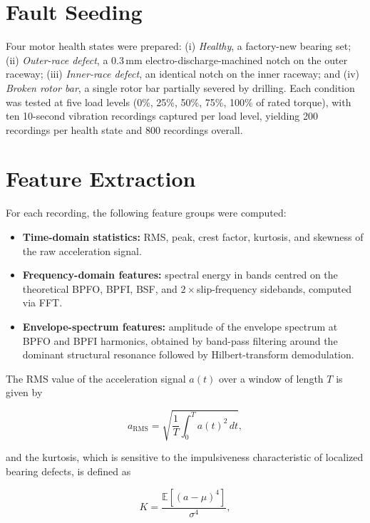 \documentclass[12pt,a4paper]{report}
\begin{document}
\section{Fault Seeding}
Four motor health states were prepared: (i) \emph{Healthy}, a factory-new bearing set; (ii)
\emph{Outer-race defect}, a 0.3\,mm electro-discharge-machined notch on the outer raceway; (iii)
\emph{Inner-race defect}, an identical notch on the inner raceway; and (iv) \emph{Broken rotor
bar}, a single rotor bar partially severed by drilling. Each condition was tested at five load
levels (0\%, 25\%, 50\%, 75\%, 100\% of rated torque), with ten 10-second vibration recordings
captured per load level, yielding 200 recordings per health state and 800 recordings overall.

\section{Feature Extraction}
For each recording, the following feature groups were computed:

\begin{itemize}
  \item \textbf{Time-domain statistics:} RMS, peak, crest factor, kurtosis, and skewness of the
        raw acceleration signal.
  \item \textbf{Frequency-domain features:} spectral energy in bands centred on the theoretical
        BPFO, BPFI, BSF, and $2\times$slip-frequency sidebands, computed via FFT.
  \item \textbf{Envelope-spectrum features:} amplitude of the envelope spectrum at BPFO and BPFI
        harmonics, obtained by band-pass filtering around the dominant structural resonance
        followed by Hilbert-transform demodulation.
\end{itemize}

The RMS value of the acceleration signal $a(t)$ over a window of length $T$ is given by

\begin{equation}
  a_{\mathrm{RMS}} = \sqrt{\frac{1}{T}\int_{0}^{T} a(t)^2 \, dt},
  \label{eq:rms}
\end{equation}

and the kurtosis, which is sensitive to the impulsiveness characteristic of localized bearing
defects, is defined as

\begin{equation}
  K = \frac{\mathbb{E}\left[(a - \mu)^4\right]}{\sigma^4},
  \label{eq:kurtosis}
\end{equation}
\end{document}
